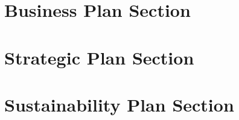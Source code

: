\documentclass[11pt,fleqn]{book} %
\begin{document}
\part{Business Plan Section}

\part{Strategic Plan Section}

\part{Sustainability Plan Section}
\end{document}
